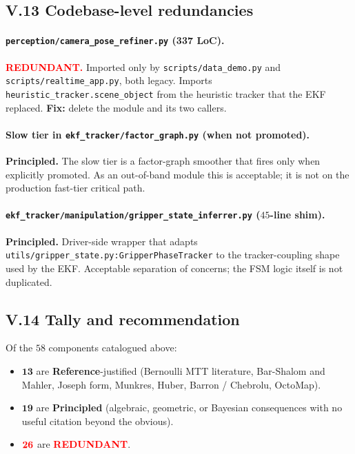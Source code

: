 \documentclass[11pt]{article}
\newcommand{\REDUNDANT}{\textcolor{red}{\textbf{REDUNDANT.}}}
\newcommand{\PRINCIPLED}{\textbf{Principled.}}
\begin{document}
\subsection*{V.13 Codebase-level redundancies}

\paragraph{\texttt{perception/camera\_pose\_refiner.py} (337 LoC).}
\REDUNDANT{} Imported only by \texttt{scripts/data\_demo.py} and
\texttt{scripts/realtime\_app.py}, both legacy. Imports
\texttt{heuristic\_tracker.scene\_object} from the heuristic tracker
that the EKF replaced.
\textbf{Fix:} delete the module and its two callers.

\paragraph{Slow tier in \texttt{ekf\_tracker/factor\_graph.py} (when
not promoted).}
\PRINCIPLED{} The slow tier is a factor-graph smoother that fires only
when explicitly promoted. As an out-of-band module this is
acceptable; it is not on the production fast-tier critical path.

\paragraph{\texttt{ekf\_tracker/manipulation/gripper\_state\_inferrer.py}
($45$-line shim).}
\PRINCIPLED{} Driver-side wrapper that adapts
\texttt{utils/gripper\_state.py:GripperPhaseTracker} to the
tracker-coupling shape used by the EKF. Acceptable separation of
concerns; the FSM logic itself is not duplicated.

\subsection*{V.14 Tally and recommendation}

Of the $58$ components catalogued above:
\begin{itemize}[leftmargin=1.5em,itemsep=0pt,topsep=2pt]
\item $\textbf{13}$ are \textbf{Reference}-justified (Bernoulli MTT
  literature, Bar-Shalom and Mahler, Joseph form, Munkres, Huber,
  Barron / Chebrolu, OctoMap).
\item $\textbf{19}$ are \textbf{Principled} (algebraic, geometric, or
  Bayesian consequences with no useful citation beyond the obvious).
\item $\textcolor{red}{\textbf{26}}$ are
  \textcolor{red}{\textbf{REDUNDANT}}.
\end{itemize}
\end{document}
